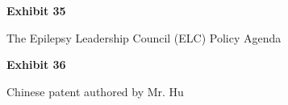 \documentclass{article}
\begin{document}

\vspace*{\fill}
\begin{center}

{\LARGE \bf
Exhibit 35
}

\vspace{10\baselineskip}

{\large The Epilepsy Leadership Council (ELC) Policy Agenda}

\end{center}
\vspace*{\fill}

 

\vspace*{\fill}
\begin{center}

{\LARGE \bf
Exhibit 36
}

\vspace{10\baselineskip}

{\large Chinese patent authored by Mr. Hu}

\end{center}
\vspace*{\fill}

% 
\end{document}
